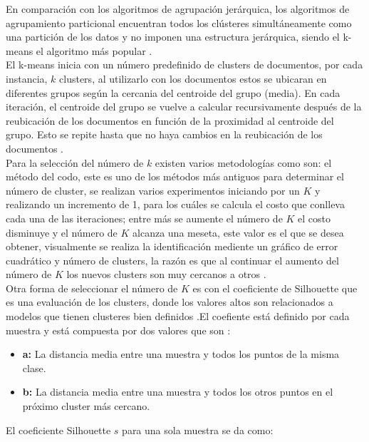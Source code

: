 {En comparación con los algoritmos de agrupación jerárquica, los algoritmos de agrupamiento  particional encuentran todos los clústeres simultáneamente como una partición de los datos y no imponen una estructura jerárquica, siendo el k-means el algoritmo más popular \cite{Jain2010}. \\

El k-means inicia con un número predefinido de  clusters de documentos, por cada instancia, $k$ clusters, al utilizarlo con los documentos estos se ubicaran en diferentes grupos según  la cercania del centroide del grupo (media). En cada iteración, el centroide del grupo se vuelve a calcular recursivamente después de la reubicación de los documentos en función de la proximidad al centroide del grupo. Esto se repite hasta que no haya cambios en la reubicación de los documentos \cite{Renganathan2017}. \\

Para la selección del número de $k$ existen varios metodologías como son: el método del codo, este es uno de los métodos más antiguos para determinar el número de cluster, se realizan varios experimentos iniciando por un $K$  y realizando un incremento de 1, para los cuáles se calcula el costo que conlleva cada una de las iteraciones; entre más se aumente el número de $K$ el costo disminuye y el número de $K$ alcanza una meseta, este valor es el que se desea obtener, visualmente se realiza la identificación mediente un gráfico de error cuadrático y número de clusters, la razón es que al continuar el aumento del número de $K$ los nuevos clusters son muy cercanos a otros \cite{Kodinariya2013}.\\ 

Otra forma de seleccionar el número de $K$ es con el coeficiente de Silhouette que es una evaluación de los clusters, donde los valores altos son relacionados a modelos que tienen clusteres bien definidos .El coefiente está definido por cada muestra y está compuesta por dos valores que son \cite{scikit-learn,Rousseeuw1987}:

\begin{itemize}
	\item \textbf{a:} La distancia media entre una muestra y todos los puntos de la misma clase.
	\item \textbf{b:} La distancia media entre una muestra y todos los otros puntos en el próximo cluster más cercano.
\end{itemize}

El coeficiente Silhouette $s$ para una sola muestra se da como:

}
